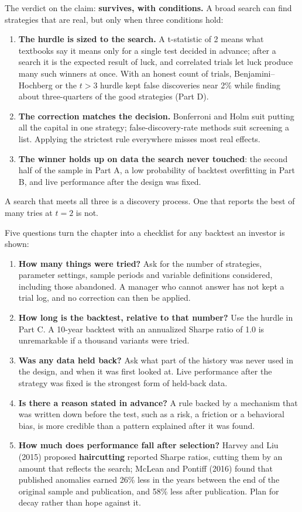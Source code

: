 The verdict on the claim: \textbf{survives, with conditions.} A broad search can find strategies that are real, but only when three conditions hold:

\begin{enumerate}
  \item \textbf{The hurdle is sized to the search.} A t-statistic of 2 means what textbooks say it means only for a single test decided in advance; after a search it is the expected result of luck, and correlated trials let luck produce many such winners at once. With an honest count of trials, Benjamini--Hochberg or the $t > 3$ hurdle kept false discoveries near 2\% while finding about three-quarters of the good strategies (Part D).
  \item \textbf{The correction matches the decision.} Bonferroni and Holm suit putting all the capital in one strategy; false-discovery-rate methods suit screening a list. Applying the strictest rule everywhere misses most real effects.
  \item \textbf{The winner holds up on data the search never touched}: the second half of the sample in Part A, a low probability of backtest overfitting in Part B, and live performance after the design was fixed.
\end{enumerate}

A search that meets all three is a discovery process. One that reports the best of many tries at $t = 2$ is not.

Five questions turn the chapter into a checklist for any backtest an investor is shown:

\begin{enumerate}
  \item \textbf{How many things were tried?} Ask for the number of strategies, parameter settings, sample periods and variable definitions considered, including those abandoned. A manager who cannot answer has not kept a trial log, and no correction can then be applied.
  \item \textbf{How long is the backtest, relative to that number?} Use the hurdle in Part C. A 10-year backtest with an annualized Sharpe ratio of 1.0 is unremarkable if a thousand variants were tried.
  \item \textbf{Was any data held back?} Ask what part of the history was never used in the design, and when it was first looked at. Live performance after the strategy was fixed is the strongest form of held-back data.
  \item \textbf{Is there a reason stated in advance?} A rule backed by a mechanism that was written down before the test, such as a risk, a friction or a behavioral bias, is more credible than a pattern explained after it was found.
  \item \textbf{How much does performance fall after selection?} Harvey and Liu (2015) proposed \textbf{haircutting} reported Sharpe ratios, cutting them by an amount that reflects the search; McLean and Pontiff (2016) found that published anomalies earned 26\% less in the years between the end of the original sample and publication, and 58\% less after publication. Plan for decay rather than hope against it.
\end{enumerate}

